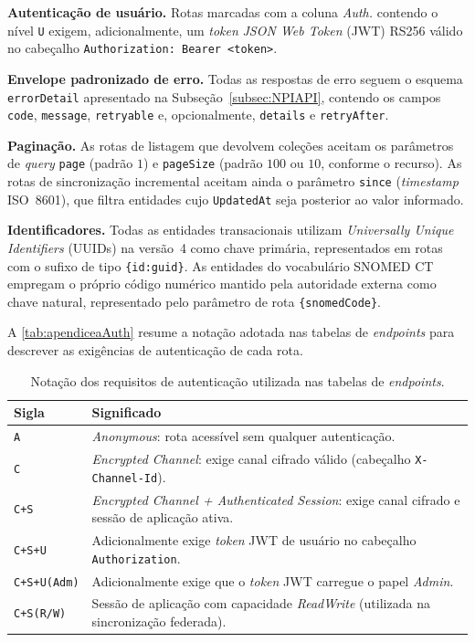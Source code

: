 \textbf{Autenticação de usuário.} Rotas marcadas com a coluna \textit{Auth.} contendo o nível \texttt{U} exigem, adicionalmente, um \textit{token} \textit{JSON Web Token} (JWT) RS256 válido no cabeçalho \texttt{Authorization: Bearer <token>}.

\textbf{Envelope padronizado de erro.} Todas as respostas de erro seguem o esquema \texttt{errorDetail} apresentado na Subseção~\ref{subsec:NPIAPI}, contendo os campos \texttt{code}, \texttt{message}, \texttt{retryable} e, opcionalmente, \texttt{details} e \texttt{retryAfter}.

\textbf{Paginação.} As rotas de listagem que devolvem coleções aceitam os parâmetros de \textit{query} \texttt{page} (padrão $1$) e \texttt{pageSize} (padrão $100$ ou $10$, conforme o recurso). As rotas de sincronização incremental aceitam ainda o parâmetro \texttt{since} (\textit{timestamp} ISO~8601), que filtra entidades cujo \texttt{UpdatedAt} seja posterior ao valor informado.

\textbf{Identificadores.} Todas as entidades transacionais utilizam \textit{Universally Unique Identifiers} (UUIDs) na versão~4 como chave primária, representados em rotas com o sufixo de tipo \texttt{\{id:guid\}}. As entidades do vocabulário SNOMED CT empregam o próprio código numérico mantido pela autoridade externa como chave natural, representado pelo parâmetro de rota \texttt{\{snomedCode\}}.

A \autoref{tab:apendiceaAuth} resume a notação adotada nas tabelas de \textit{endpoints} para descrever as exigências de autenticação de cada rota.

\begin{table}[htpb]
\centering
\caption{Notação dos requisitos de autenticação utilizada nas tabelas de \textit{endpoints}.}
\label{tab:apendiceaAuth}
\begin{tabular}{|p{}|p{}|}
\hline
\textbf{Sigla} & \textbf{Significado} \\ \hline
\texttt{A} & \textit{Anonymous}: rota acessível sem qualquer autenticação. \\ \hline
\texttt{C} & \textit{Encrypted Channel}: exige canal cifrado válido (cabeçalho \texttt{X-Channel-Id}). \\ \hline
\texttt{C+S} & \textit{Encrypted Channel + Authenticated Session}: exige canal cifrado e sessão de aplicação ativa. \\ \hline
\texttt{C+S+U} & Adicionalmente exige \textit{token} JWT de usuário no cabeçalho \texttt{Authorization}. \\ \hline
\texttt{C+S+U(Adm)} & Adicionalmente exige que o \textit{token} JWT carregue o papel \textit{Admin}. \\ \hline
\texttt{C+S(R/W)} & Sessão de aplicação com capacidade \textit{ReadWrite} (utilizada na sincronização federada). \\ \hline
\end{tabular}
\end{table}

